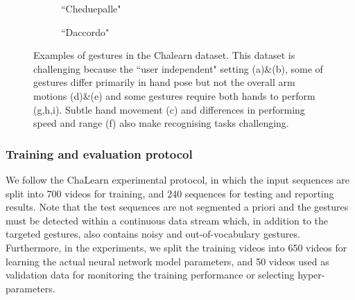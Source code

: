 \begin{figure}[t]
\begin{subfigure}[c]{0.15\textwidth}
                \caption{\small{``Cheduepalle"}}
        \end{subfigure}
       \begin{subfigure}[c]{0.15\textwidth}
        \centering
                \caption{\small{``Daccordo"}}
        \end{subfigure}
  \caption{
\small{Examples of gestures in the Chalearn dataset.
This dataset is challenging because the ``user independent" setting (a)\&(b), some of gestures differ primarily in hand pose but not the overall arm motions (d)\&(e) and some gestures require both hands to perform (g,h,i).
Subtle hand movement (c) and differences in performing speed and range (f) also make recognising tasks challenging.
  }}
\label{fig:chalearnclasses}
\end{figure}
\subsubsection{Training and evaluation protocol}

We follow the ChaLearn experimental protocol, in which the input sequences are split into 700 videos for training, and 240 sequences for testing and reporting results.
Note that the   test sequences  are not segmented a priori and the gestures must be detected within a continuous data stream
which, in addition to the targeted gestures, also contains noisy and out-of-vocabulary gestures.
%
Furthermore, in the experiments, we split the training videos into 650 videos for learning the actual neural network model parameters, and 50 videos
used as validation data for monitoring the training performance or selecting hyper-parameters.


